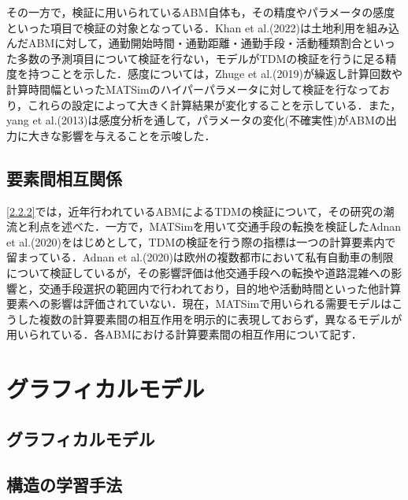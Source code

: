 その一方で，検証に用いられているABM自体も，その精度やパラメータの感度といった項目で検証の対象となっている．Khan et al.(2022)は土地利用を組み込んだABMに対して，通勤開始時間・通勤距離・通勤手段・活動種類割合といった多数の予測項目について検証を行ない，モデルがTDMの検証を行うに足る精度を持つことを示した．感度については，Zhuge et al.(2019)が繰返し計算回数や計算時間幅といったMATSimのハイパーパラメータに対して検証を行なっており，これらの設定によって大きく計算結果が変化することを示している．また，yang et al.(2013)は感度分析を通して，パラメータの変化(不確実性)がABMの出力に大きな影響を与えることを示唆した．

\subsection{要素間相互関係}\label{2.2.3}

\ref{2.2.2}では，近年行われているABMによるTDMの検証について，その研究の潮流と利点を述べた．一方で，MATSimを用いて交通手段の転換を検証したAdnan et al.(2020)をはじめとして，TDMの検証を行う際の指標は一つの計算要素内で留まっている．Adnan et al.(2020)は欧州の複数都市において私有自動車の制限について検証しているが，その影響評価は他交通手段への転換や道路混雑への影響と，交通手段選択の範囲内で行われており，目的地や活動時間といった他計算要素への影響は評価されていない．現在，MATSimで用いられる需要モデルはこうした複数の計算要素間の相互作用を明示的に表現しておらず，異なるモデルが用いられている．各ABMにおける計算要素間の相互作用について記す．



\section{グラフィカルモデル}\label{2.3}

\subsection{グラフィカルモデル}\label{2.3.1}

\subsection{構造の学習手法}\label{2.3.2}